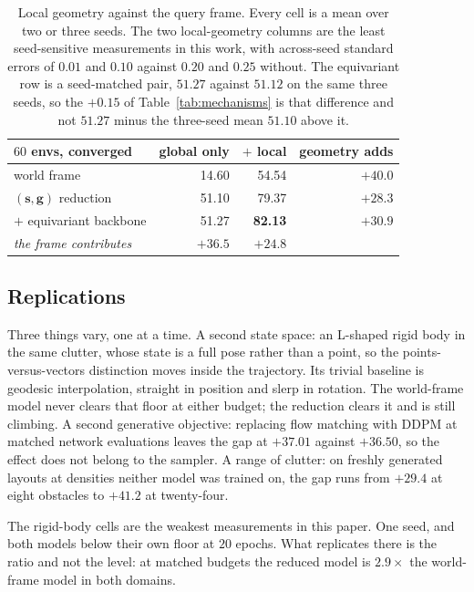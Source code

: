 \documentclass[10pt,twocolumn,letterpaper]{article}
\newcommand{\toprule}{\hline}
\newcommand{\midrule}{\hline}
\newcommand{\bottomrule}{\hline}}
\newcommand{\svec}{\mathbf{s}}
\newcommand{\gvec}{\mathbf{g}}
\begin{document}
\begin{table}[t]
\centering
\footnotesize
\setlength{\tabcolsep}{3.5pt}
\begin{tabular}{@{}lrrr@{}}
\toprule
$60$ envs, converged & global only & $+$ local & geometry adds \\
\midrule
world frame                    & 14.60 & 54.54 & $+40.0$ \\
$(\svec,\gvec)$ reduction      & 51.10 & 79.37 & $+28.3$ \\
\quad $+$ equivariant backbone & 51.27 & \textbf{82.13} & $+30.9$ \\
\midrule
\emph{the frame contributes}   & $+36.5$ & $+24.8$ & \\
\bottomrule
\end{tabular}
\caption{Local geometry against the query frame. Every cell is a mean over two or
three seeds. The two local-geometry columns are the least seed-sensitive
measurements in this work, with across-seed standard errors of $0.01$ and $0.10$
against $0.20$ and $0.25$ without. The equivariant row is a seed-matched pair,
$51.27$ against $51.12$ on the same three seeds, so the $+0.15$ of
Table~\ref{tab:mechanisms} is that difference and not $51.27$ minus the
three-seed mean $51.10$ above it.}
\label{tab:twobytwo}
\end{table}

\subsection{Replications}
\label{sec:replications}
Three things vary, one at a time. A second state space: an L-shaped rigid body in
the same clutter, whose state is a full pose rather than a point, so the
points-versus-vectors distinction moves inside the trajectory. Its trivial
baseline is geodesic interpolation, straight in position and slerp in rotation.
The world-frame model never clears that floor at either budget; the reduction
clears it and is still climbing. A second generative objective: replacing flow
matching with DDPM at matched network evaluations leaves the gap at $+37.01$
against $+36.50$, so the effect does not belong to the sampler. A range of
clutter: on freshly generated layouts at densities neither model was trained on,
the gap runs from $+29.4$ at eight obstacles to $+41.2$ at twenty-four.

The rigid-body cells are the weakest measurements in this paper. One seed, and
both models below their own floor at $20$ epochs. What replicates there is the
ratio and not the level: at matched budgets the reduced model is $2.9\times$ the
world-frame model in both domains.
\end{document}
